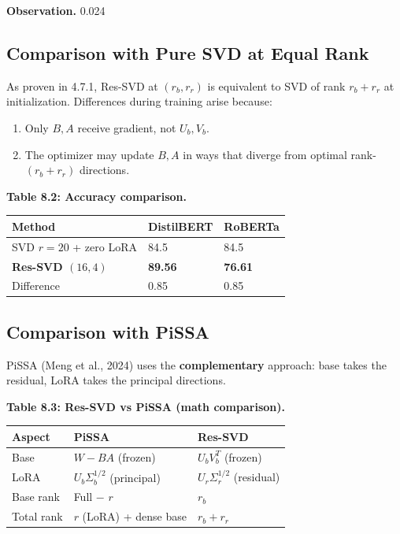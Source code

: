 \textbf{Observation.} 0.024

\subsection{Comparison with Pure SVD at Equal Rank}

As proven in  4.7.1, Res-SVD at $(r_b, r_r)$ is equivalent to SVD of 
rank $r_b + r_r$ at initialization. Differences during training arise 
because:

\begin{enumerate}
\item Only $B, A$ receive gradient, not $U_b, V_b$.
\item The optimizer may update $B, A$ in ways that diverge from optimal
  rank-$(r_b + r_r)$ directions.

\end{enumerate}
\textbf{Table 8.2: Accuracy comparison.}

\begin{table}[H]
\centering
\small
\begin{tabular}{lll}
\toprule
\textbf{Method} & \textbf{DistilBERT} & \textbf{RoBERTa} \\
\midrule
SVD $r=20$ + zero LoRA & 84.5 & 84.5 \\
\textbf{Res-SVD $(16, 4)$} & \textbf{89.56} & \textbf{76.61} \\
Difference & 0.85 & 0.85 \\
\bottomrule
\end{tabular}
\end{table}

\subsection{Comparison with PiSSA}

PiSSA (Meng et al., 2024) uses the \textbf{complementary} approach: base takes 
the residual, LoRA takes the principal directions. 

\textbf{Table 8.3: Res-SVD vs PiSSA (math comparison).}

\begin{table}[H]
\centering
\small
\begin{tabular}{lll}
\toprule
\textbf{Aspect} & \textbf{PiSSA} & \textbf{Res-SVD} \\
\midrule
Base & $W - BA$ (frozen) & $U_b V_b^T$ (frozen) \\
LoRA & $U_b \Sigma_b^{1/2}$ (principal) & $U_r \Sigma_r^{1/2}$ (residual) \\
Base rank & Full $-$ $r$ & $r_b$ \\
Total rank & $r$ (LoRA) + dense base & $r_b + r_r$ \\
\bottomrule
\end{tabular}
\end{table}

